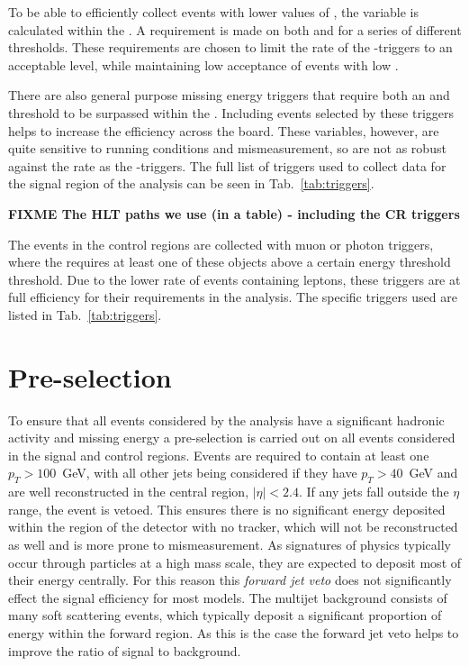 To be able to efficiently collect events with lower
values of \HT, the \alphat variable is calculated within the \HLT. A
requirement is made on both \alphat and \HT for a series of different
\HT thresholds. These requirements are chosen to limit the rate of the
\alphat-\HT triggers to an acceptable level, while maintaining low
acceptance of events with low \HT. 

There are also general purpose missing energy triggers that require
both an \MHT and \MET threshold to be surpassed within the \HLT.
Including events selected by these triggers helps to increase the
efficiency across the board. These variables, however, are quite sensitive to
running conditions and mismeasurement, so are not as robust against
the \HLT rate as the \alphat-\HT triggers. The full list of
triggers used to collect data for the signal region of the \alphat
analysis can be seen in Tab.~\ref{tab:triggers}.

\bf{FIXME} The HLT paths we use (in a table) - including the CR
triggers

The events in the control regions are collected with muon or photon
triggers, where the \HLT requires at least one of these objects above
a certain energy threshold threshold. Due to the lower rate of events
containing leptons, these triggers are at full efficiency for their
requirements in the analysis. The specific triggers used are listed in
Tab.~\ref{tab:triggers}.

\section{Pre-selection}%
\label{sec:preselection}

To ensure that all events considered by the analysis have a
significant hadronic activity and missing energy a pre-selection is
carried out on all events considered in the signal and control
regions. Events are required to contain at least one $p_T>100$~GeV,
with all other jets being considered if they have $p_T>40$~GeV and are
well reconstructed in the central region, $|\eta|<2.4$. If any jets
fall outside the $\eta$ range, the event is vetoed. This ensures there
is no significant energy deposited within the region of the detector
with no tracker, which will not be reconstructed as well and is more
prone to mismeasurement. As signatures of \BSM physics typically occur
through particles at a high mass scale, they are expected to deposit
most of their energy centrally. For this reason this \emph{forward jet
veto} does not significantly effect the signal efficiency for most
models. The \QCD multijet background consists of many
soft scattering events, which typically deposit a significant
proportion of energy within the forward region. As this is the case
the forward jet veto helps to improve the ratio of signal to
background.

